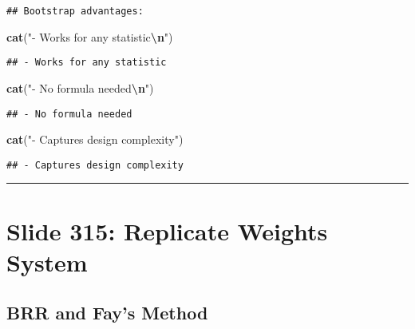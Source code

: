 \documentclass[
]{article}
\newenvironment{Shaded}{\begin{snugshade}}{\end{snugshade}}
\newcommand{\FunctionTok}[1]{\textcolor[rgb]{0.13,0.29,0.53}{\textbf{#1}}}
\newcommand{\NormalTok}[1]{#1}
\newcommand{\SpecialCharTok}[1]{\textcolor[rgb]{0.81,0.36,0.00}{\textbf{#1}}}
\newcommand{\StringTok}[1]{\textcolor[rgb]{0.31,0.60,0.02}{#1}}
\begin{document}
\begin{verbatim}
## Bootstrap advantages:
\end{verbatim}

\begin{Shaded}
\begin{Highlighting}[]
\FunctionTok{cat}\NormalTok{(}\StringTok{"{-} Works for any statistic}\SpecialCharTok{\textbackslash{}n}\StringTok{"}\NormalTok{)}
\end{Highlighting}
\end{Shaded}

\begin{verbatim}
## - Works for any statistic
\end{verbatim}

\begin{Shaded}
\begin{Highlighting}[]
\FunctionTok{cat}\NormalTok{(}\StringTok{"{-} No formula needed}\SpecialCharTok{\textbackslash{}n}\StringTok{"}\NormalTok{)}
\end{Highlighting}
\end{Shaded}

\begin{verbatim}
## - No formula needed
\end{verbatim}

\begin{Shaded}
\begin{Highlighting}[]
\FunctionTok{cat}\NormalTok{(}\StringTok{"{-} Captures design complexity"}\NormalTok{)}
\end{Highlighting}
\end{Shaded}

\begin{verbatim}
## - Captures design complexity
\end{verbatim}

\begin{center}\rule{0.5\linewidth}{0.5pt}\end{center}

\section{Slide 315: Replicate Weights
System}\label{slide-315-replicate-weights-system}

\subsection{BRR and Fay's Method}\label{brr-and-fays-method}
\end{document}
